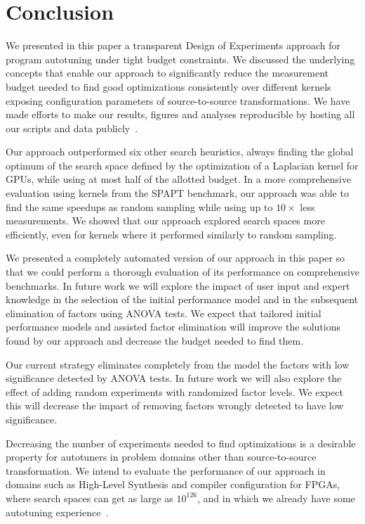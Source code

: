 \documentclass[conference]{IEEEtran}
\begin{document}
\section{Conclusion}
\label{sec:org169f53c}
We presented in this paper a transparent Design of Experiments approach for
program autotuning under tight budget constraints. We discussed the underlying
concepts that enable our approach to significantly reduce the measurement budget
needed to find good optimizations consistently over different kernels exposing
configuration parameters of source-to-source transformations. We have made
efforts to make our results, figures and analyses reproducible by hosting all
our scripts and data publicly~\cite{bruel2018ipdps19}.

Our approach outperformed six other search heuristics, always finding the global
optimum of the search space defined by the optimization of a Laplacian kernel
for GPUs, while using at most half of the allotted budget. In a more
comprehensive evaluation using kernels from the SPAPT benchmark, our approach
was able to find the same speedups as random sampling while using up to
\(10\times\) less measurements. We showed that our approach explored search spaces
more efficiently, even for kernels where it performed similarly to random
sampling.

We presented a completely automated version of our approach in this paper so
that we could perform a thorough evaluation of its performance on comprehensive
benchmarks. In future work we will explore the impact of user input and expert
knowledge in the selection of the initial performance model and in the
subsequent elimination of factors using ANOVA tests. We expect that tailored
initial performance models and assisted factor elimination will improve the
solutions found by our approach and decrease the budget needed to find them.

Our current strategy eliminates completely from the model the factors with low
significance detected by ANOVA tests. In future work we will also explore the
effect of adding random experiments with randomized factor levels. We expect
this will decrease the impact of removing factors wrongly detected to have low
significance.

Decreasing the number of experiments needed to find optimizations is a desirable
property for autotuners in problem domains other than source-to-source
transformation. We intend to evaluate the performance of our approach in domains
such as High-Level Synthesis and compiler configuration for FPGAs, where search
spaces can get as large as \(10^{126}\), and in which we already have some
autotuning experience~\cite{bruel2017autotuninghls}.
\end{document}

